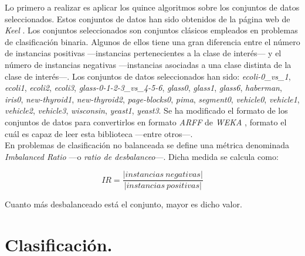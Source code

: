 Lo primero a realizar es aplicar los quince algoritmos sobre los conjuntos de datos seleccionados. Estos conjuntos de datos han sido obtenidos de la página web de \textit{Keel} \cite{keel} \cite{keelweb}. Los conjuntos seleccionados son conjuntos clásicos empleados en problemas de clasificación binaria. Algunos de ellos tiene una gran diferencia entre el número de instancias positivas —instancias pertenecientes a la clase de interés— y el número de instancias negativas —instancias asociadas a una clase distinta de la clase de interés—. Los conjuntos de datos seleccionados han sido: \textit{ecoli-0\_vs\_1}, \textit{ecoli1}, \textit{ecoli2}, \textit{ecoli3}, \textit{glass-0-1-2-3\_vs\_4-5-6}, \textit{glass0}, \textit{glass1}, \textit{glass6}, \textit{haberman}, \textit{iris0}, \textit{new-thyroid1}, \textit{new-thyroid2}, \textit{page-blocks0}, \textit{pima}, \textit{segment0}, \textit{vehicle0}, \textit{vehicle1}, \textit{vehicle2}, \textit{vehicle3}, \textit{wisconsin}, \textit{yeast1}, \textit{yeast3}. Se ha modificado el formato de los conjuntos de datos para convertirlos en formato \textit{ARFF} \cite{arffwiki} de \textit{WEKA} \cite{weka} \cite{wekaweb}, formato el cuál es capaz de leer esta biblioteca —entre otros—.\\

En problemas de clasificación no balanceada se define una métrica denominada \textit{Imbalanced Ratio} —o \textit{ratio de desbalanceo}—. Dicha medida se calcula como:

\begin{equation}
	IR = \frac{\left | instancias\ negativas \right |}{\left | instancias\ positivas \right |}
\end{equation}

Cuanto más desbalanceado está el conjunto, mayor es dicho valor. 

\section{Clasificación.} \label{sec:clasificacion}

